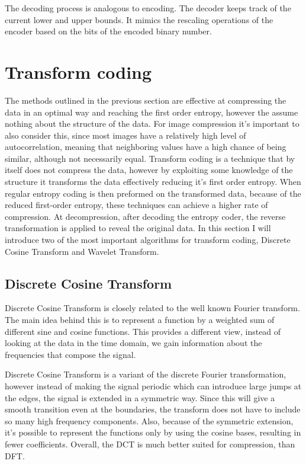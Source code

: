 The decoding process is analogous to encoding. The decoder keeps track of the
current lower and upper bounds. It mimics the rescaling operations of the encoder
based on the bits of the encoded binary number.

\section{Transform coding}
The methods outlined in the previous section are effective at compressing the data in an optimal way and reaching the first order entropy, however the assume nothing about the structure of the data. For image compression it's important to also consider this, since most images have a relatively high level of autocorrelation, meaning that neighboring values have a high chance of being similar, although not necessarily equal. Transform coding is a technique that by itself does not compress the data, however by exploiting some knowledge of the structure it transforms the data effectively reducing it's first order entropy. When regular entropy coding is then preformed on the transformed data, because of the reduced first-order entropy, these techniques can achieve a higher rate of compression. At decompression, after decoding the entropy coder, the reverse transformation is applied to reveal the original data. In this section I will introduce two of the most important algorithms for transform coding, Discrete Cosine Transform and Wavelet Transform.
\subsection{Discrete Cosine Transform}
Discrete Cosine Transform \cite{ahmed_discrete_1974} is closely related to the well known Fourier transform. The main idea behind this is to represent a function by a weighted sum of different sine and cosine functions. This provides a different view, instead of looking at the data in the time domain, we gain information about the frequencies that compose the signal. 

Discrete Cosine Transform is a variant of the discrete Fourier transformation, however instead of making the signal periodic which can introduce large jumps at the edges, the signal is extended in a symmetric way. Since this will give a smooth transition even at the boundaries, the transform does not have to include so many high frequency components. Also, because of the symmetric extension, it's possible to represent the functions only by using the cosine bases, resulting in fewer coefficients. Overall, the DCT is much better suited for compression, than DFT.

